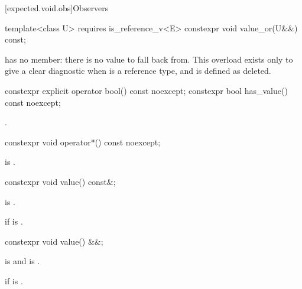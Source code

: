 [expected.void.obs]{Observers}

%
\begin{itemdecl}
template<class U>
  requires is_reference_v<E>
constexpr void value_or(U&&) const;
\end{itemdecl}

\begin{itemdescr}
\pnum
\remarks
{} has no  member: there is no value to fall back from. This overload exists only to give a clear diagnostic when  is a reference type, and is defined as deleted.
\end{itemdescr}

%
%
\begin{itemdecl}
constexpr explicit operator bool() const noexcept;
constexpr bool has_value() const noexcept;
\end{itemdecl}

\begin{itemdescr}
\pnum
\returns
{}.
\end{itemdescr}

%
\begin{itemdecl}
constexpr void operator*() const noexcept;
\end{itemdecl}

\begin{itemdescr}
\pnum
\hardexpects
{} is .
\end{itemdescr}

%
\begin{itemdecl}
constexpr void value() const&;
\end{itemdecl}

\begin{itemdescr}
\pnum
\mandates
{} is .

\pnum
\throws
{} if  is .
\end{itemdescr}

%
\begin{itemdecl}
constexpr void value() &&;
\end{itemdecl}

\begin{itemdescr}
\pnum
\mandates
{} is  and  is .

\pnum
\throws
{} if  is .
\end{itemdescr}

